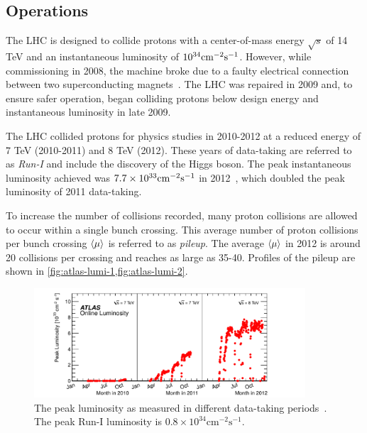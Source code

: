 \subsection{Operations}

The LHC is designed to collide protons with a center-of-mass energy $\sqrt s$ of 14 TeV and an instantaneous luminosity of $10^{34}\text{cm}^{-2} \text{s}^{-1}$. However, while commissioning in 2008, the machine broke due to a faulty electrical connection between two superconducting magnets~\cite{cern-incident}. The LHC was repaired in 2009 and, to ensure safer operation, began colliding protons below design energy and instantaneous luminosity in late 2009.

The LHC collided protons for physics studies in 2010-2012 at a reduced energy of 7 TeV (2010-2011) and 8 TeV (2012). These years of data-taking are referred to as \textit{Run-I} and include the discovery of the Higgs boson. The peak instantaneous luminosity achieved was $7.7 \times 10^{33}\text{cm}^{-2} \text{s}^{-1}$ in 2012~\cite{cern-run1}, which doubled the peak luminosity of 2011 data-taking. 

To increase the number of collisions recorded, many proton collisions are allowed to occur within a single bunch crossing. This average number of proton collisions per bunch crossing $\langle\mu\rangle$ is referred to as \textit{pileup}. The average $\langle\mu\rangle$ in 2012 is around 20 collisions per crossing and reaches as large as 35-40. Profiles of the pileup are shown in \cref{fig:atlas-lumi-1,fig:atlas-lumi-2}.

\begin{figure}[tp]
  \centering
  \includegraphics[width=0.90\textwidth]{figures/lhc-atlas/lumivstime}
  \caption{The peak luminosity as measured in different data-taking periods~\cite{atlas-lumi}. The peak Run-I luminosity is $0.8\times 10^{34} \text{cm}^{-2} \text{s}^{-1}$.}
  \label{fig:atlas-lumi-1}
\end{figure}

